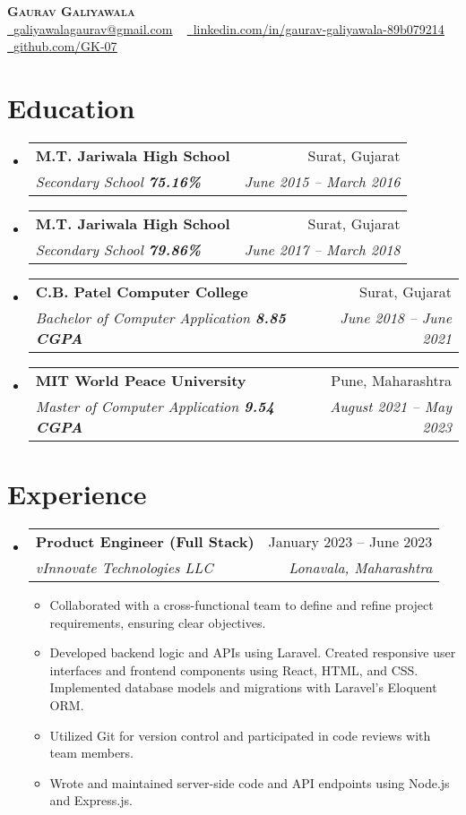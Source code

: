 \documentclass[letterpaper,11pt]{article}
\makeatletter
\newcommand{\resumeItem}[1]{
  \item\small{
    {#1 \vspace{-2pt}}
  }
}
\newcommand{\resumeSubheading}[4]{
  \vspace{-2pt}\item
    \begin{tabular*}{0.97\textwidth}[t]{l@{\extracolsep{\fill}}r}
      \textbf{#1} & #2 \\
      \textit{\small#3} & \textit{\small #4} \\
    \end{tabular*}\vspace{-7pt}
}
\newcommand{\resumeSubHeadingListStart}{\begin{itemize}[leftmargin=0.05in, label={}]}
\newcommand{\resumeSubHeadingListEnd}{\end{itemize}}
\newcommand{\resumeItemListStart}{\begin{itemize}\vspace{2pt}}
\newcommand{\resumeItemListEnd}{\end{itemize}\vspace{-5pt}}
\makeatother
\begin{document}

\begin{center}
    \textbf{\Huge \scshape Gaurav Galiyawala} \\ \vspace{1pt}
    \href{mailto:x@gmail.com}{\raisebox{-0.2\height}\faEnvelope\  \underline{galiyawalagaurav@gmail.com}} ~ 
    \href{https://linkedin.com/in//}{\raisebox{-0.2\height}\faLinkedin\ \underline{linkedin.com/in/gaurav-galiyawala-89b079214}}  ~
    \href{https://github.com/}{\raisebox{-0.2\height}\faGithub\ \underline{github.com/GK-07}}
    \vspace{-8pt}
\end{center}


\section{Education}
  \resumeSubHeadingListStart
    \resumeSubheading
      {M.T. Jariwala High School}{Surat, Gujarat}
      {Secondary School  \textbf{75.16\%}}{June 2015 -- March 2016}
    \resumeSubheading
       {M.T. Jariwala High School}{Surat, Gujarat}
      {Secondary School  \textbf{79.86\%}}{June 2017 -- March 2018}
    \resumeSubheading
       {C.B. Patel Computer College}{Surat, Gujarat}
      {Bachelor of Computer Application  \textbf{8.85 CGPA}}{June 2018 -- June 2021}
    \resumeSubheading
       {MIT World Peace University}{Pune, Maharashtra}
      {Master of Computer Application  \textbf{9.54 CGPA}}{August 2021 -- May 2023}
  \resumeSubHeadingListEnd


\section{Experience}
  \resumeSubHeadingListStart

    \resumeSubheading
      {Product Engineer (Full Stack)}{January 2023 -- June 2023}
      {vInnovate Technologies LLC}{Lonavala, Maharashtra}
      \resumeItemListStart
        \resumeItem{Collaborated with a cross-functional team to define and refine project requirements, ensuring clear objectives.}
        \resumeItem{Developed backend logic and APIs using Laravel. Created responsive user interfaces and frontend components using React, HTML, and CSS. Implemented database models and migrations with Laravel's Eloquent ORM.}
        \resumeItem{ Utilized Git for version control and participated in code reviews with team members.}
         \resumeItem{Wrote and maintained server-side code and API endpoints using Node.js and Express.js.}
      \resumeItemListEnd
    \resumeSubHeadingListEnd
      
\end{document}

